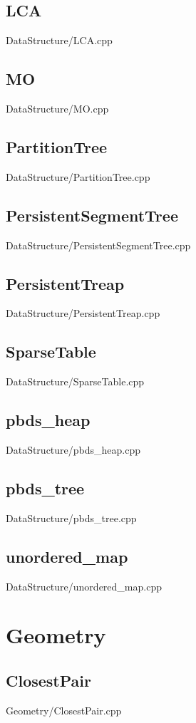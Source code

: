     \subsection{LCA}
         {DataStructure/LCA.cpp}
    \subsection{MO}
         {DataStructure/MO.cpp}
    \subsection{PartitionTree}
         {DataStructure/PartitionTree.cpp}
    \subsection{PersistentSegmentTree}
         {DataStructure/PersistentSegmentTree.cpp}
    \subsection{PersistentTreap}
         {DataStructure/PersistentTreap.cpp}
    \subsection{SparseTable}
         {DataStructure/SparseTable.cpp}
    \subsection{pbds\_heap}
         {DataStructure/pbds_heap.cpp}
    \subsection{pbds\_tree}
         {DataStructure/pbds_tree.cpp}
    \subsection{unordered\_map}
         {DataStructure/unordered_map.cpp}


\section{Geometry}
    \subsection{ClosestPair}
         {Geometry/ClosestPair.cpp}

